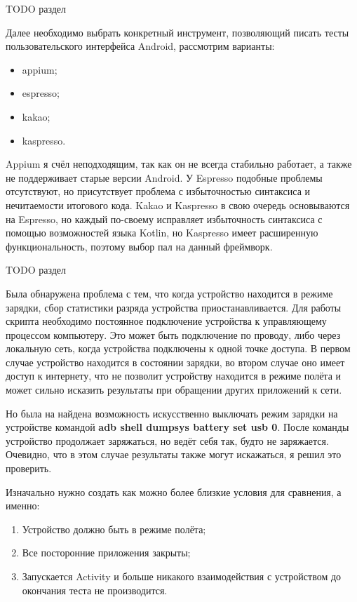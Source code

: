 \documentclass[a4paper,14pt]{extarticle} %
\begin{document}
	{\huge TODO раздел}
	
	Далее необходимо выбрать конкретный инструмент, позволяющий писать тесты пользовательского интерфейса Android, рассмотрим варианты:
	\begin{itemize}
		\item appium;
		\item espresso;
		\item kakao;
		\item kaspresso.
	\end{itemize}
	
	Appium я счёл неподходящим, так как он не всегда стабильно работает, а также не поддерживает старые версии Android. У Espresso подобные проблемы отсутствуют, но присутствует проблема с избыточностью синтаксиса и нечитаемости итогового кода. Kakao и Kaspresso в свою очередь основываются на Espresso, но каждый по-своему исправляет избыточность синтаксиса с помощью возможностей языка Kotlin, но Kaspresso имеет расширенную функциональность, поэтому выбор пал на данный фреймворк.
	
	{\huge TODO раздел}
	
	Была обнаружена проблема с тем, что когда устройство находится в режиме зарядки, сбор статистики разряда устройства приостанавливается. Для работы скрипта необходимо постоянное подключение устройства к управляющему процессом компьютеру. Это может быть подключение по проводу, либо через локальную сеть, когда устройства подключены к одной точке доступа. В первом случае устройство находится в состоянии зарядки, во втором случае оно имеет доступ к интернету, что не позволит устройству находится в режиме полёта и может сильно исказить результаты при обращении других приложений к сети.
	
	Но была на найдена возможность искусственно выключать режим зарядки на устройстве командой \textbf{adb shell dumpsys battery set usb 0}. После команды устройство продолжает заряжаться, но ведёт себя так, будто не заряжается. Очевидно, что в этом случае результаты также могут искажаться, я решил это проверить.
	
	Изначально нужно создать как можно более близкие условия для сравнения, а именно:
	\begin{enumerate}
		\item Устройство должно быть в режиме полёта;
		\item Все посторонние приложения закрыты;
		\item Запускается Activity и больше никакого взаимодействия с устройством до окончания теста не производится.
	\end{enumerate}
\end{document}

